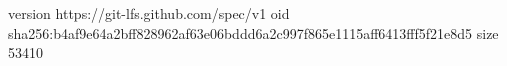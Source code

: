 version https://git-lfs.github.com/spec/v1
oid sha256:b4af9e64a2bff828962af63e06bddd6a2c997f865e1115aff6413fff5f21e8d5
size 53410
